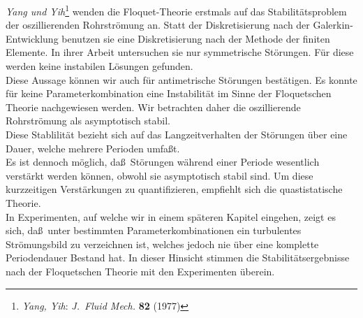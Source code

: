 \documentclass[10pt,a5paper,oneside,draft]{book}
\numberwithin{equation}{chapter}
\begin{document}
\textsl{Yang und Yih}\footnote{\label{bib:yang_yih:2}\textsl{Yang, Yih}: \textit{J.\ Fluid Mech.} \textbf{82} (1977)}
wenden die Floquet-\!Theorie erstmals auf das Stabilit\"atsproblem der oszillierenden Rohrstr\"omung an.
Statt der Diskretisierung nach der Galerkin-Entwicklung benutzen sie eine Diskretisierung nach der Methode der finiten Elemente.
In ihrer Arbeit untersuchen sie nur symmetrische St\"orungen.
F\"ur diese werden keine instabilen L\"osungen gefunden.\\

Diese Aussage k\"onnen wir auch f\"ur antimetrische St\"orungen best\"atigen.
Es konnte f\"ur keine Parameterkombination eine Instabilit\"at im Sinne der Floquetschen Theorie nachgewiesen werden.
Wir betrachten daher die oszillierende Rohrstr\"omung als asymptotisch stabil.\\
Diese Stablilit\"at bezieht sich auf das Langzeitverhalten der St\"orungen \"uber eine Dauer, welche mehrere Perioden umfa\ss t.\\

Es ist dennoch m\"oglich, da\ss\ St\"orungen w\"ahrend einer Periode wesentlich verst\"arkt werden k\"onnen, obwohl sie asymptotisch stabil sind.
Um diese kurzzeitigen Verst\"arkungen zu quantifizieren, empfiehlt sich die quastistatische Theorie.\\

In Experimenten, auf welche wir in einem sp\"ateren Kapitel eingehen, zeigt es sich, da\ss\ unter bestimmten Parameterkombinationen ein turbulentes Str\"omungsbild zu verzeichnen ist, welches jedoch nie \"uber eine komplette Periodendauer Bestand hat.
In dieser Hinsicht stimmen die Stabilit\"atsergebnisse nach der Floquetschen Theorie mit den Experimenten \"uberein.

\end{document}
